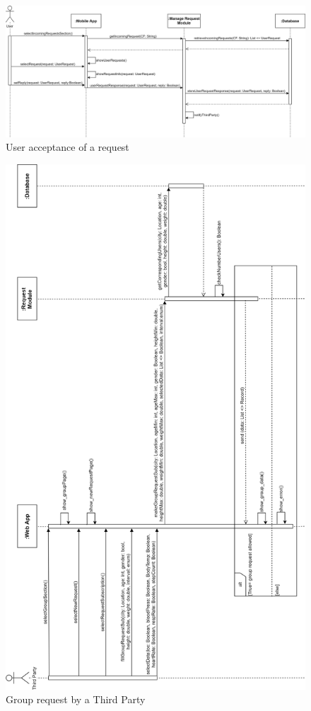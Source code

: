\begin{figure}[H]
    \centering
    \includegraphics[scale=0.15]{DD/Pictures/acceptRequest.png}
    \caption{User acceptance of a request}
\end{figure}

\begin{figure}[H]
    \centering
    \includegraphics[scale=0.21]{DD/Pictures/groupRequestSeqDiagDDV.png}
    \caption{Group request by a Third Party}
\end{figure}

